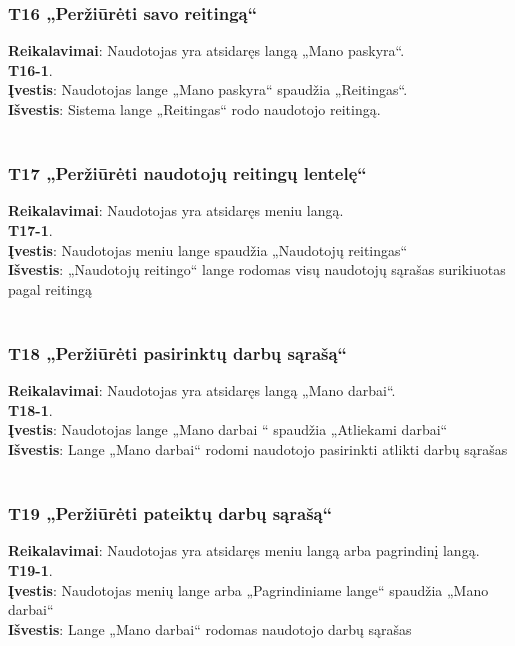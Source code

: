 \documentclass{VUMIFPSbakalaurinis}
\begin{document}
\subsubsection{T16 „Peržiūrėti savo reitingą“}
\textbf{Reikalavimai}: Naudotojas yra atsidaręs langą „Mano paskyra“. \\
\textbf{T16-1}. \\
\textbf{Įvestis}: Naudotojas lange „Mano paskyra“ spaudžia  „Reitingas“. \\
\textbf{Išvestis}: Sistema lange  „Reitingas“ rodo naudotojo reitingą.\\ \\

\subsubsection{T17 „Peržiūrėti naudotojų reitingų lentelę“}
\textbf{Reikalavimai}: Naudotojas yra atsidaręs meniu langą. \\
\textbf{T17-1}. \\
\textbf{Įvestis}: Naudotojas meniu lange spaudžia „Naudotojų reitingas“\\
\textbf{Išvestis}: „Naudotojų reitingo“ lange rodomas visų naudotojų sąrašas surikiuotas pagal reitingą\\ \\

\subsubsection{T18 „Peržiūrėti pasirinktų darbų sąrašą“}
\textbf{Reikalavimai}: Naudotojas yra atsidaręs langą „Mano darbai“. \\
\textbf{T18-1}. \\
\textbf{Įvestis}: Naudotojas lange „Mano darbai “ spaudžia „Atliekami darbai“\\
\textbf{Išvestis}: Lange „Mano darbai“ rodomi naudotojo pasirinkti atlikti darbų sąrašas\\ \\

\subsubsection{T19 „Peržiūrėti pateiktų darbų sąrašą“}
\textbf{Reikalavimai}: Naudotojas yra atsidaręs meniu langą arba pagrindinį langą. \\
\textbf{T19-1}. \\
\textbf{Įvestis}:  Naudotojas menių lange arba „Pagrindiniame lange“ spaudžia „Mano darbai“\\
\textbf{Išvestis}: Lange „Mano darbai“ rodomas naudotojo darbų sąrašas\\ \\
\end{document}
